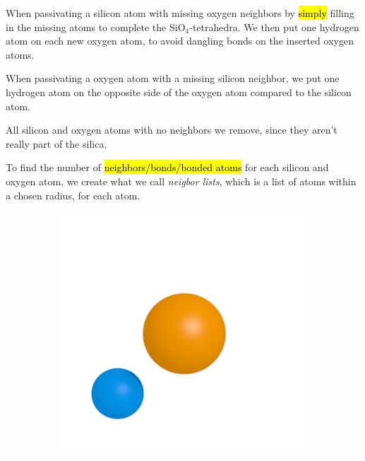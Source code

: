 When passivating a silicon atom with missing oxygen neighbors by \hl{simply} filling in the missing atoms to complete the SiO$_4$-tetrahedra. We then put one hydrogen atom on each new oxygen atom, to avoid dangling bonds on the inserted oxygen atoms.

When passivating a oxygen atom with a missing silicon neighbor, we put one hydrogen atom on the opposite side of the oxygen atom compared to the silicon atom.

All silicon and oxygen atoms with no neighbors we remove, since they aren't really part of the silica.

To find the number of \hl{neighbors/bonds/bonded atoms} for each silicon and oxygen atom, we create what we call \emph{neigbor lists}, which is a list of atoms within a chosen radius, for each atom.
%
\begin{figure}[htpb]%
    \centering%
    \begin{subfigure}[b]{0.24\textwidth}%
        \includegraphics[width=\textwidth]{images/passivation/tetrahedra01.png}%
        \caption{}%
    \end{subfigure}%
    \begin{subfigure}[b]{0.24\textwidth}%

\end{subfigure}
\end{figure}
